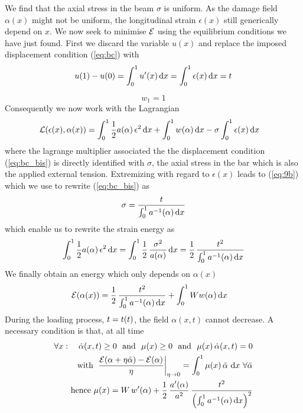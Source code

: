 \documentclass[]{article}
\renewcommand*\d{\mathop{}\!\mathrm{d}} %
\begin{document}
We find that the axial stress in the beam $\sigma$ is uniform. As the damage field $\alpha(x)$ might not be uniform, the longitudinal strain $\epsilon(x)$ still generically depend on $x$.
%
We now seek to minimise ${\cal E}$ using the equilibrium conditions we have just found. First we discard the variable $u(x)$ and replace the imposed displacement condition (\ref{eq:bc}) with 
\begin{align}
\label{eq:bc_bis}
u(1)-u(0) = \int_0^1 u'(x) \d x = \int_0^1 \epsilon(x) \d x =  \load
\end{align} 

\begin{equation}
    w_1=1
\end{equation}
Consequently we now work with the Lagrangian
\begin{align}
{\cal L}(\epsilon(x),\alpha(x)) & = \int_0^1 \frac12 a(\alpha) \, \epsilon^2 \d x+  \int_0^1  w(\alpha) \d x - \sigma \int_0^1 \epsilon(x) \d x
\end{align} 
where the lagrange multiplier associated the the displacement condition (\ref{eq:bc_bis}) is directly identified with $\sigma$, the axial stress in the bar which is also the applied external tension.
Extremizing with regard to $\epsilon(x)$ leads to (\ref{eq:9b}) which we use to rewrite (\ref{eq:bc_bis}) as
\begin{align}
\sigma = \frac{\load}{ \int_0^1 a^{-1}(\alpha)  \d x}
\end{align} 
which enable us to rewrite the strain energy as
\begin{align}
 \int_0^1 \frac12 a(\alpha) \, \epsilon^2 \d x =  \int_0^1 \frac12 \, \frac{\sigma^2}{a(\alpha)}  \d x
 = \frac12 \, \frac{\load^2}{\int_0^1 a^{-1}(\alpha) \d x}
\end{align} 
We finally obtain an energy which only depends on $\alpha(x)$
\begin{align}
{\cal E}(\alpha(x)) & = \frac12 \, \frac{\load^2}{\int_0^1 a^{-1}(\alpha) \d x}  +
 \int_0^1 W  w(\alpha) \d x 
\end{align} 
During the loading process, $t = t(t)$, the field $\alpha(x,t)$ cannot decrease.
A necessary condition is that, at all time
\begin{subequations}
\begin{align}
\forall x: \quad \dot{\alpha}(x,t) \ge 0 \text{~ and ~}
\mu(x) \ge 0 \text{~ and ~}
\mu(x) \, \dot{\alpha}(x,t) = 0 \\
\text{ with } \left. \frac{{\cal E}(\alpha+\eta \bar{\alpha})-{\cal E}(\alpha)}{\eta} \right|_{\eta \to 0}
=
\int_0^1 \mu(x) \, \bar{\alpha} \, \d x \text{ } \forall \bar{\alpha}
\\
\text{ hence } \mu(x)=
W \, w'(\alpha) + \frac12 \, \frac{a'(\alpha)}{a^2 } \, \frac{\load^2}{\left( \int_0^1 a^{-1}(\alpha) \d x \right)^2}
\end{align} 
\end{subequations}
\end{document}
